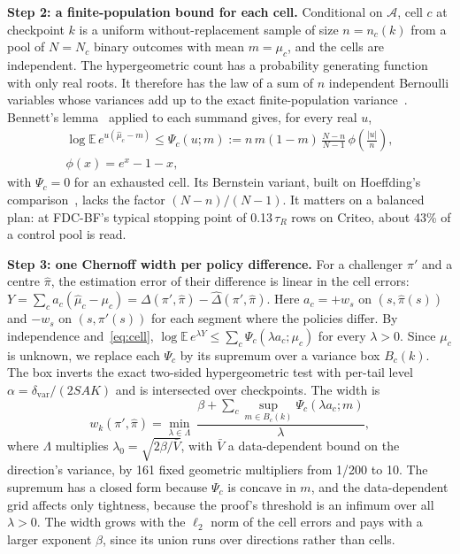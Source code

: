 \documentclass[sigconf,anonymous,review]{acmart}
\newcommand{\cA}{\mathcal{A}}
\newcommand{\dvar}{\delta_{\text{var}}}
\begin{document}
\textbf{Step 2: a finite-population bound for each cell.} Conditional on $\cA$, cell $c$ at checkpoint $k$ is a uniform without-replacement sample of size $n = n_c(k)$ from a pool of $N = N_c$ binary outcomes with mean $m = \mu_c$, and the cells are independent. The hypergeometric count has a probability generating function with only real roots. It therefore has the law of a sum of $n$ independent Bernoulli variables whose variances add up to the exact finite-population variance~\citep{vatutin1982limit,tang2023poisson}. Bennett's lemma~\citep{bennett1962probability} applied to each summand gives, for every real $u$,
\begin{equation}\label{eq:cell}
\begin{gathered}
\log \mathbb{E}\, e^{u(\hat\mu_c - m)} \le \Psi_c(u; m) := n\, m(1-m)\,\frac{N-n}{N-1}\,\phi\!\left(\frac{|u|}{n}\right),\\
\phi(x) = e^x - 1 - x,
\end{gathered}
\end{equation}
with $\Psi_c = 0$ for an exhausted cell. Its Bernstein variant, built on Hoeffding's comparison~\citep{hoeffding1963probability}, lacks the factor $(N-n)/(N-1)$. It matters on a balanced plan: at FDC-BF's typical stopping point of 0.13\,$\tau_R$ rows on Criteo, about 43\% of a control pool is read.

\textbf{Step 3: one Chernoff width per policy difference.} For a challenger $\pi'$ and a centre $\hat\pi$, the estimation error of their difference is linear in the cell errors: $Y = \sum_c a_c(\hat\mu_c - \mu_c) = \Delta(\pi',\hat\pi) - \hat\Delta(\pi',\hat\pi)$. Here $a_c = +w_s$ on $(s, \hat\pi(s))$ and $-w_s$ on $(s, \pi'(s))$ for each segment where the policies differ. By independence and~\eqref{eq:cell}, $\log \mathbb{E}\, e^{\lambda Y} \le \sum_c \Psi_c(\lambda a_c; \mu_c)$ for every $\lambda > 0$. Since $\mu_c$ is unknown, we replace each $\Psi_c$ by its supremum over a variance box $B_c(k)$. The box inverts the exact two-sided hypergeometric test with per-tail level $\alpha = \dvar/(2SAK)$ and is intersected over checkpoints. The width is
\begin{equation}\label{eq:width}
w_k(\pi',\hat\pi) = \min_{\lambda \in \Lambda}\ \frac{\beta + \sum_c \sup_{m \in B_c(k)} \Psi_c(\lambda a_c; m)}{\lambda},
\end{equation}
where $\Lambda$ multiplies $\lambda_0 = \sqrt{2\beta/\bar V}$, with $\bar V$ a data-dependent bound on the direction's variance, by 161 fixed geometric multipliers from 1/200 to 10. The supremum has a closed form because $\Psi_c$ is concave in $m$, and the data-dependent grid affects only tightness, because the proof's threshold is an infimum over all $\lambda > 0$. The width grows with the $\ell_2$ norm of the cell errors and pays with a larger exponent $\beta$, since its union runs over directions rather than cells.
\end{document}
